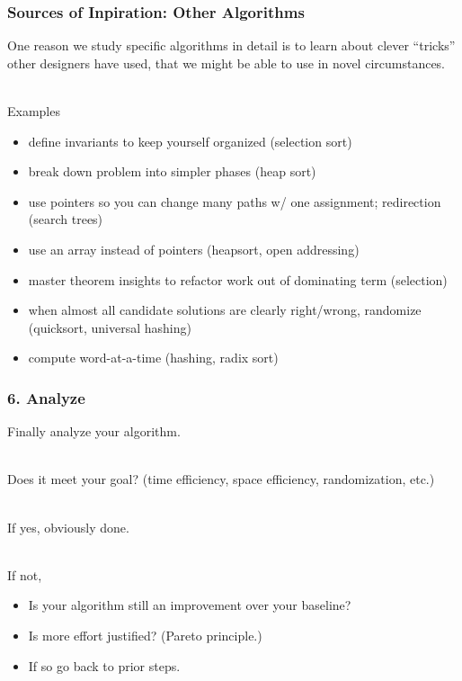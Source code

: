 \documentclass{beamer}
\newcommand{\stanza}{ \\~\ }
\begin{document}
\begin{frame} \frametitle{Sources of Inpiration: Other Algorithms}
One reason we study specific algorithms in detail is to learn about
clever ``tricks'' other designers have used, that we might be able to use in
novel circumstances. \stanza

Examples
\begin{itemize}
  \item define invariants to keep yourself organized (selection sort)
  \item break down problem into simpler phases (heap sort)
  \item use pointers so you can change many paths w/ one assignment;
    redirection (search trees)
  \item use an array instead of pointers (heapsort, open addressing)
  \item master theorem insights to refactor work out of dominating term
    (selection)
  \item when almost all candidate solutions are clearly right/wrong, randomize
    (quicksort, universal hashing)
  \item compute word-at-a-time (hashing, radix sort)
\end{itemize}
\end{frame}

\begin{frame} \frametitle{6. Analyze}
Finally analyze your algorithm. \stanza

Does it meet your goal? (time efficiency, space efficiency, randomization, etc.) \stanza

If yes, obviously done. \stanza

If not,
\begin{itemize}
  \item Is your algorithm still an improvement over your baseline?
  \item Is more effort justified? (Pareto principle.)
  \item If so go back to prior steps.
\end{itemize}
\end{frame}
\end{document}

